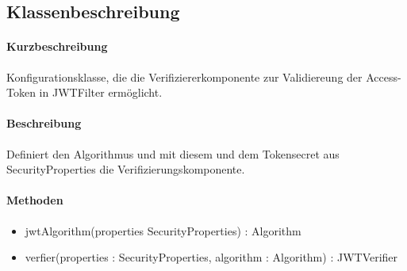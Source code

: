 \subsection*{Klassenbeschreibung}%
\paragraph*{Kurzbeschreibung}
Konfigurationsklasse, die die Verifiziererkomponente zur Validiereung der Access-Token in JWTFilter ermöglicht.
\paragraph*{Beschreibung}
Definiert den Algorithmus und mit diesem und dem Tokensecret aus \dq SecurityProperties \dq die Verifizierungskomponente.
\paragraph*{Methoden}
\begin{itemize}
	\item jwtAlgorithm(properties SecurityProperties) : Algorithm
    \item verfier(properties : SecurityProperties, algorithm : Algorithm) : JWTVerifier
\end{itemize}	